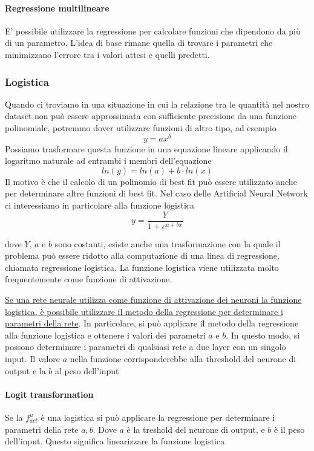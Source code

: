 \paragraph{Regressione multilineare}
E' possibile utilizzare la regressione per calcolare funzioni che dipendono da più di un parametro. L'idea di base rimane quella di trovare i parametri che minimizzano l'errore tra i valori attesi e quelli predetti.


\subsubsection{Logistica}
Quando ci troviamo in una situazione in cui la relazione tra le quantità nel nostro dataset non può essere approssimata con sufficiente precisione da una funzione polinomiale, potremmo dover utilizzare funzioni di altro tipo, ad esempio
$$y = ax^b$$
Possiamo trasformare questa funzione in una equazione lineare applicando il logaritmo naturale ad entrambi i membri dell'equazione
$$ln(y) = ln(a) + b \cdot ln(x)$$
Il motivo è che il calcolo di un polinomio di best fit può essere utilizzato anche per determinare altre funzioni di best fit. Nel caso delle Artificial Neural Network ci interessiamo in particolare alla funzione logistica
$$y = \frac{Y}{1 + e^{a+bx}}$$

dove $Y$, $a$ e $b$ sono costanti, esiste anche una trasformazione con la quale il problema può essere ridotto alla computazione di una linea di regressione, chiamata regressione logistica. La funzione logistica viene utilizzata molto frequentemente come funzione di attivazione.

\uline{Se una rete neurale utilizza come funzione di attivazione dei neuroni la funzione logistica, è possibile utilizzare il metodo della regressione per determinare i parametri della rete}. In particolare, si può applicare il metodo della regressione alla funzione logistica e ottenere i valori dei parametri $a$ e $b$. In questo modo, si possono determinare i parametri di qualsiasi rete a due layer con un singolo input. Il valore $a$ nella funzione corrisponderebbe alla threshold del neurone di output e la $b$ al peso dell’input

\paragraph{Logit transformation}
Se la \textit{$f^u_{act}$} è una logistica si può applicare la regressione per determinare i parametri della rete $a, b$. Dove $a$ è la treshold del neurone di output, e $b$ è il peso dell'input. Questo significa linearizzare la funzione logistica

